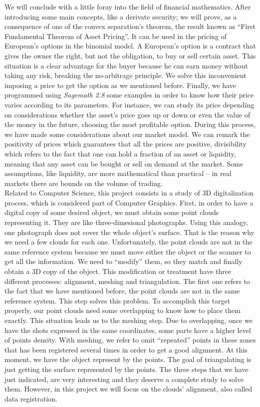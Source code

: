 We will conclude with a little foray into the field of financial mathematics. After introducing some main concepts, like a derivate security; we will prove, as a consequence of one of the convex separation's theorem, the result known as ``First Fundamental Theorem of Asset Pricing''. It can be used in the pricing of European's options in the binomial model. A European's option is a contract that gives the owner the right, but not the obligation, to buy or sell certain asset. This situation is a clear advantage for the buyer because he can earn money without taking any risk, breaking the no-arbitrage principle. We solve this inconvenient imposing a price to get the option as we mentioned before. Finally, we have programmed using \textit{Sagemath 2.8} some examples in order to know how their price varies according to its parameters. For instance, we can study its price depending on considerations whether the asset's price goes up or down or even the value of the money in the future, choosing the most profitable option. During this process, we have made some considerations about our market model. We can remark the positivity of prices which guarantees that all the prices are positive, divisibility which refers to the fact that one can hold a fraction of an asset or liquidity, meaning that any asset can be bought or sell on demand at the market. Some assumptions, like liquidity, are more mathematical than practical -- in real markets there are bounds on the volume of trading. \\

Related to Computer Science, this project consists in a study of 3D digitalization process, which is considered part of Computer Graphics. First, in order to have a digital copy of some desired object, we must obtain some point clouds representing it. They are like three-dimesional photographs. Using this analogy, one photograph does not cover the whole object's surface. That is the reason why we need a few clouds for each one. Unfortunately, the point clouds are not in the same reference system because we must move either the object or the scanner to get all the information. We need to ``modify'' them, so they match and finally obtain a 3D copy of the object. This modification or treatment have three different processes: alignment, meshing and triangulation. The first one refers to the fact that we have mentioned before, the point clouds are not in the same reference system. This step solves this problem. To accomplish this target properly, our point clouds need some overlapping to know how to place them exactly. This situation leads us to the meshing step. Due to overlapping, once we have the shots expressed in the same coordinates, some parts have a higher level of points density. With meshing, we refer to omit ``repeated'' points in these zones that has been registered several times in order to get a good alignment. At this moment, we have the object represent by the points. The goal of triangulating is just getting the surface represented by the points. The three steps that we have just indicated, are very interesting and they deserve a complete study to solve them. However, in this project we will focus on the clouds' alignment, also called data registration. \\

